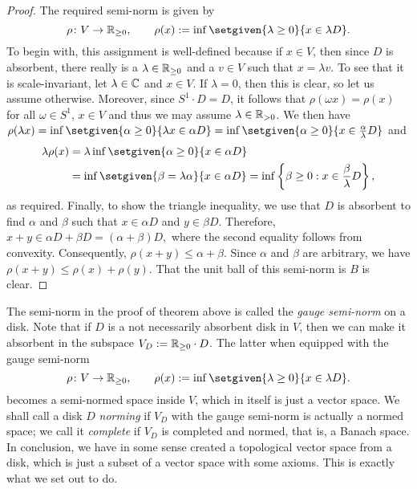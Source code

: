 \begin{proof}
    The required semi-norm is given by 
    \[\rho \colon V \to \R_{\geq 0}, \qquad \rho(x) \defeq \inf \setgiven{\lambda \geq 0}{x \in \lambda D}.\]
    To begin with, this assignment is well-defined because if \(x \in V\), then since \(D\) is absorbent, there really is a \(\lambda \in \mathbb R_{\geq 0}\) and a \(v \in V\) such that \(x = \lambda v\). To see that it is scale-invariant, let \(\lambda \in \mathbb C\) and \(x \in V\). If \(\lambda = 0\), then this is clear, so let us assume otherwise. 
    Moreover, since $S^1 \cdot D = D$, it follows that $\rho(\omega x) = \rho(x)$ for all $\omega \in S^1$, $x \in V$
    and thus we may assume $\lambda \in \mathbb R_{> 0}$.
    We then have \(\rho(\lambda x) = \inf \setgiven{\alpha \geq  0}{\lambda x \in \alpha D} = \inf \setgiven{\alpha \geq 0}{x \in \frac{\alpha}{\lambda} D }\) and
    \begin{align*}
        \lambda \rho(x) &= \lambda\inf \setgiven{\alpha \geq 0}{x \in \alpha D} \\
        & =\inf \setgiven{\beta = \lambda\alpha }{x \in \alpha D} = \inf\left\{\beta \ge 0 :  x \in \frac{\beta}{\lambda} D \right\},
    \end{align*} as required. Finally, to show the triangle inequality, we use that \(D\) is absorbent to find \(\alpha\) and \(\beta\) such that \(x \in \alpha D\) and \( y \in \beta D\). Therefore, \(x + y \in \alpha D + \beta D = (\alpha + \beta) D,\) where the second equality follows from convexity. Consequently, \(\rho(x + y) \leq \alpha + \beta\). Since \(\alpha\) and \(\beta\) are arbitrary, we have \(\rho(x+ y) \leq \rho(x) + \rho(y)\). That the unit ball of this semi-norm is \(B\) is clear.
\end{proof}

The semi-norm in the proof of theorem above is called the \emph{gauge semi-norm} on a disk. Note that if \(D\) is a not necessarily absorbent disk in \(V\), then we can make it absorbent in the subspace \(V_D \mathrel{:=} \mathbb R_{\geq 0} \cdot D\). The latter when equipped with the gauge semi-norm
 \[\rho \colon V \to \R_{\geq 0}, \qquad \rho(x) \defeq \inf \setgiven{\lambda \geq 0}{x \in \lambda D}.\]
becomes a semi-normed space inside \(V\), which in itself is just a vector space. We shall call a disk \(D\) \emph{norming} if \(V_D\) with the gauge semi-norm is actually a normed space; we call it \emph{complete} if \(V_D\) is completed and normed, that is, a Banach space. In conclusion, we have in some sense created a topological vector space from a disk, which is just a subset of a vector space with some axioms. This is exactly what we set out to do.


